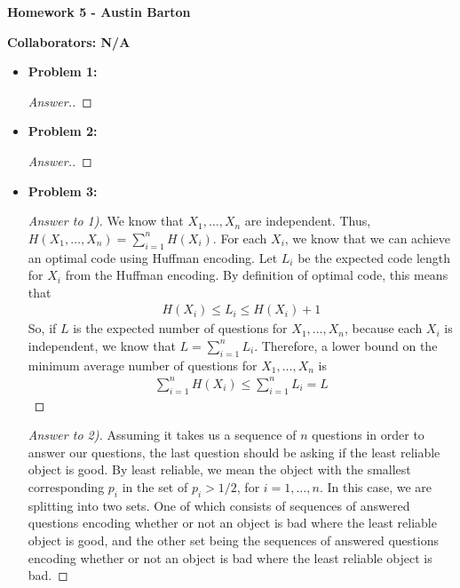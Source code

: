 \documentclass[10pt,twoside]{article}
\begin{document}
\begin{center}
\huge{\bf{Homework 5} - Austin Barton}
\end{center}

\medskip

\noindent \large{\textbf{Collaborators: N/A}}

\medskip

\begin{itemize}
    \item\textbf{Problem 1:} \newline
    \noindent\makebox[\linewidth]{\rule{18cm}{0.4pt}}
    \begin{proof}[Answer.] 
    
    \end{proof}
    
    \item\textbf{Problem 2:} \newline
    \noindent\makebox[\linewidth]{\rule{18cm}{0.4pt}}
    
    \begin{proof}[Answer.]
    
    \end{proof}
    
    \item\textbf{Problem 3:} \newline
    \noindent\makebox[\linewidth]{\rule{18cm}{0.4pt}}
    \begin{proof}[Answer to 1)]
    We know that $X_1, \ldots, X_n$ are independent. Thus, $H(X_1, \ldots, X_n) = \sum_{i=1}^n H(X_i)$. For each $X_i$, we know that we can achieve an optimal code using Huffman encoding. Let $L_i$ be the expected code length for $X_i$ from the Huffman encoding. By definition of optimal code, this means that 
    \begin{gather*}
        H(X_i) \leq L_i \leq H(X_i) + 1
    \end{gather*}
    So, if $L$ is the expected number of questions for $X_1, \ldots, X_n$, because each $X_i$ is independent, we know that $L = \sum_{i=1}^n L_i$. Therefore, a lower bound on the minimum average number of questions for $X_1, \ldots, X_n$ is 
    \begin{gather*}
        \sum_{i=1}^n H(X_i) \leq \sum_{i=1}^n L_i = L
    \end{gather*}
    \end{proof}

    \begin{proof}[Answer to 2)]
       Assuming it takes us a sequence of $n$ questions in order to answer our questions, the last question should be asking if the least reliable object is good. By least reliable, we mean the object with the smallest corresponding $p_i$ in the set of $p_i>1/2$, for $i=1,\ldots, n$. In this case, we are splitting into two sets. One of which consists of sequences of answered questions encoding whether or not an object is bad where the least reliable object is good, and the other set being the sequences of answered questions encoding whether or not an object is bad where the least reliable object is bad.
    \end{proof}


\end{itemize}
\end{document}
